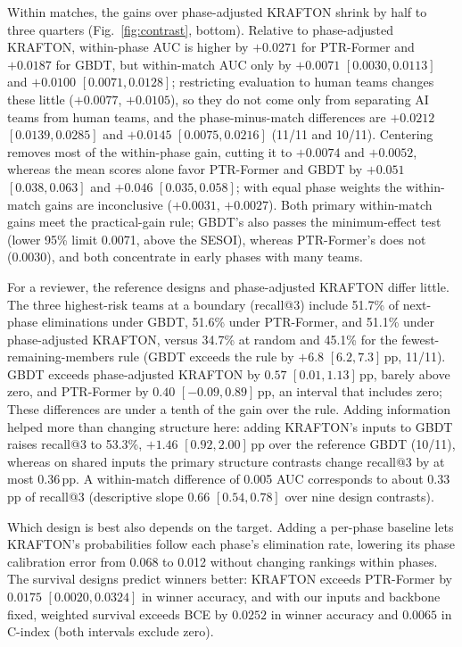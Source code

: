 \documentclass[sigconf,anonymous]{acmart}
\begin{document}
Within matches, the gains over phase-adjusted KRAFTON shrink by half to three quarters (Fig.~\ref{fig:contrast}, bottom). Relative to phase-adjusted KRAFTON, within-phase AUC is higher by $+0.0271$ for PTR-Former and $+0.0187$ for GBDT, but within-match AUC only by $+0.0071$ $[0.0030,\allowbreak 0.0113]$ and $+0.0100$ $[0.0071,\allowbreak 0.0128]$; restricting evaluation to human teams changes these little ($+0.0077$, $+0.0105$), so they do not come only from separating AI teams from human teams, and the phase-minus-match differences are $+0.0212$ $[0.0139,\allowbreak 0.0285]$ and $+0.0145$ $[0.0075,\allowbreak 0.0216]$ (11/11 and 10/11). Centering removes most of the within-phase gain, cutting it to $+0.0074$ and $+0.0052$, whereas the mean scores alone favor PTR-Former and GBDT by $+0.051$ $[0.038,\allowbreak 0.063]$ and $+0.046$ $[0.035,\allowbreak 0.058]$; with equal phase weights the within-match gains are inconclusive ($+0.0031$, $+0.0027$). Both primary within-match gains meet the practical-gain rule; GBDT's also passes the minimum-effect test (lower 95\% limit 0.0071, above the SESOI), whereas PTR-Former's does not (0.0030), and both concentrate in early phases with many teams.

For a reviewer, the reference designs and phase-adjusted KRAFTON differ little. The three highest-risk teams at a boundary (recall@3) include 51.7\% of next-phase eliminations under GBDT, 51.6\% under PTR-Former, and 51.1\% under phase-adjusted KRAFTON, versus 34.7\% at random and 45.1\% for the fewest-remaining-members rule (GBDT exceeds the rule by $+6.8$ $[6.2,\allowbreak 7.3]$\,pp, 11/11). GBDT exceeds phase-adjusted KRAFTON by $0.57$ $[0.01,\allowbreak 1.13]$\,pp, barely above zero, and PTR-Former by $0.40$ $[-0.09,\allowbreak 0.89]$\,pp, an interval that includes zero; These differences are under a tenth of the gain over the rule. Adding information helped more than changing structure here: adding KRAFTON's inputs to GBDT raises recall@3 to 53.3\%, $+1.46$ $[0.92,\allowbreak 2.00]$\,pp over the reference GBDT (10/11), whereas on shared inputs the primary structure contrasts change recall@3 by at most 0.36\,pp. A within-match difference of 0.005 AUC corresponds to about 0.33\,pp of recall@3 (descriptive slope 0.66 $[0.54,\allowbreak 0.78]$ over nine design contrasts).

Which design is best also depends on the target. Adding a per-phase baseline lets KRAFTON's probabilities follow each phase's elimination rate, lowering its phase calibration error from 0.068 to 0.012 without changing rankings within phases. The survival designs predict winners better: KRAFTON exceeds PTR-Former by $0.0175$ $[0.0020,\allowbreak 0.0324]$ in winner accuracy, and with our inputs and backbone fixed, weighted survival exceeds BCE by $0.0252$ in winner accuracy and $0.0065$ in C-index (both intervals exclude zero).
\end{document}
